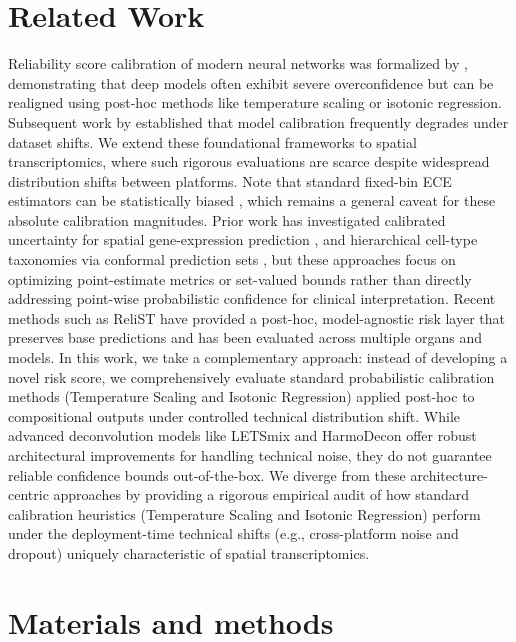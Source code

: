 \documentclass{jmlr} %
\begin{document}
\section{Related Work}
\label{sec:related}
Reliability score calibration of modern neural networks was formalized by \citet{guo2017calibration}, demonstrating that deep models often exhibit severe overconfidence but can be realigned using post-hoc methods like temperature scaling or isotonic regression. Subsequent work by \citet{ovadia2019can} established that model calibration frequently degrades under dataset shifts. We extend these foundational frameworks to spatial transcriptomics, where such rigorous evaluations are scarce despite widespread distribution shifts between platforms. Note that standard fixed-bin ECE estimators can be statistically biased \citep{roelofs2022mitigating}, which remains a general caveat for these absolute calibration magnitudes. Prior work has investigated calibrated uncertainty for spatial gene-expression prediction \citep{sun2024tissue}, and hierarchical cell-type taxonomies via conformal prediction sets \citep{corbetta2024conformal}, but these approaches focus on optimizing point-estimate metrics or set-valued bounds rather than directly addressing point-wise probabilistic confidence for clinical interpretation. Recent methods such as ReliST \citep{relist2026} have provided a post-hoc, model-agnostic risk layer that preserves base predictions and has been evaluated across multiple organs and models. In this work, we take a complementary approach: instead of developing a novel risk score, we comprehensively evaluate standard probabilistic calibration methods (Temperature Scaling and Isotonic Regression) applied post-hoc to compositional outputs under controlled technical distribution shift. While advanced deconvolution models like LETSmix \citep{zhan2025letsmix} and HarmoDecon \citep{wang2025harmodecon} offer robust architectural improvements for handling technical noise, they do not guarantee reliable confidence bounds out-of-the-box. We diverge from these architecture-centric approaches by providing a rigorous empirical audit of how standard calibration heuristics (Temperature Scaling and Isotonic Regression) perform under the deployment-time technical shifts (e.g., cross-platform noise and dropout) uniquely characteristic of spatial transcriptomics.

\section{Materials and methods}
\label{sec:methods}
\end{document}
